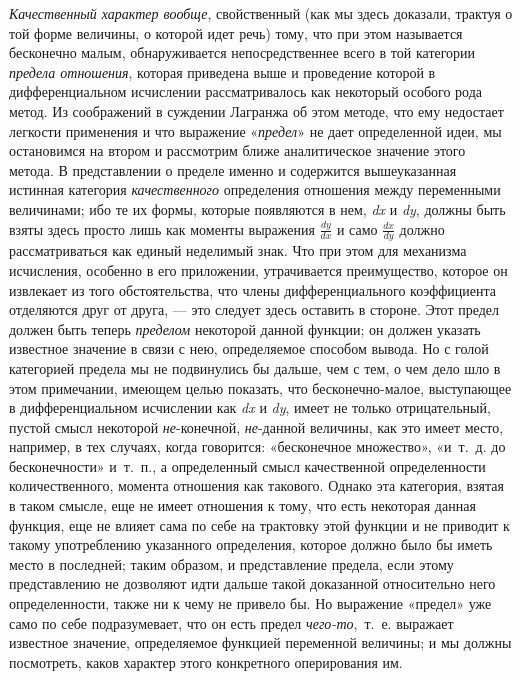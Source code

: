 {\em Качественный характер вообще}, свойственный (как мы
здесь доказали, трактуя о той форме величины, о которой идет речь) тому,
что при этом называется бесконечно малым, обнаруживается непосредственнее
всего в той категории {\em предела отношения}, которая
приведена выше и проведение которой в дифференциальном исчислении
рассматривалось как некоторый особого рода метод. Из соображений в суждении
Лагранжа об этом методе, что ему недостает легкости применения и что
выражение «{\em предел}» не дает определенной идеи, мы
остановимся на втором и рассмотрим ближе аналитическое значение этого
метода. В представлении о пределе именно и содержится вышеуказанная
истинная категория {\em качественного} определения
отношения между переменными величинами; ибо те их формы, которые появляются
в нем, {\em dx} и {\em dy}, должны
быть взяты здесь просто лишь как моменты выражения 
$\frac{\mathit{dy}}{\mathit{dx}}$  и само 
$\frac{\mathit{dx}}{\mathit{dy}}$  должно рассматриваться как единый
неделимый знак. Что при этом для механизма исчисления, особенно в его
приложении, утрачивается преимущество, которое он извлекает из того
обстоятельства, что члены дифференциального коэффициента отделяются друг от
друга, — это следует здесь оставить в стороне. Этот предел должен быть
теперь {\em пределом} некоторой данной функции; он
должен указать известное значение в связи с нею, определяемое способом
вывода. Но с голой категорией предела мы не подвинулись бы дальше, чем с
тем, о чем дело шло в этом примечании, имеющем целью показать, что
бесконечно-малое, выступающее в дифференциальном исчислении как
{\em dx} и {\em dy}, имеет не
только отрицательный, пустой смысл некоторой
{\em не}{}-конечной,
{\em не}{}-данной величины, как это имеет место,
например, в тех случаях, когда говорится: «бесконечное множество», «и~т.~д.
до бесконечности» и~т.~п., а определенный смысл качественной определенности
количественного, момента отношения как такового. Однако эта категория,
взятая в таком смысле, еще не имеет отношения к тому, что есть некоторая
данная функция, еще не влияет сама по себе на трактовку этой функции и не
приводит к такому употреблению указанного определения, которое должно было
бы иметь место в последней; таким образом, и представление предела, если
этому представлению не дозволяют идти дальше такой доказанной относительно
него определенности, также ни к чему не привело бы. Но выражение «предел»
уже само по себе подразумевает, что он есть предел
{\em чего-то},~т.~е. выражает известное значение,
определяемое функцией переменной величины; и мы должны посмотреть, каков
характер этого конкретного оперирования им.

